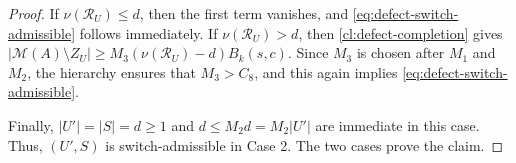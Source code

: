 \documentclass[10pt,a4paper]{amsart}
\newcommand{\M}{\mathcal M}
\newcommand{\Rcal}{\mathcal R}
\begin{document}
\begin{proof}
        If $\nu(\Rcal_U)\le d$, then the first term vanishes, and
        \eqref{eq:defect-switch-admissible} follows immediately.
        If $\nu(\Rcal_U)>d$, then \cref{cl:defect-completion} gives
        $|\M(A)\setminus Z_U|\ge
                M_3(\nu(\Rcal_U)-d)B_k(s,c)$.
        Since $M_3$ is chosen after $M_1$ and $M_2$, the hierarchy
        ensures that $M_3>C_8$, and this again implies
        \eqref{eq:defect-switch-admissible}.

        Finally, $|U'|=|S|=d\ge1$ and
        $d\le M_2d=M_2|U'|$ are immediate in this case.
        Thus, $(U',S)$ is switch-admissible in Case 2.
        The two cases prove the claim.
\end{proof}
\end{document}

